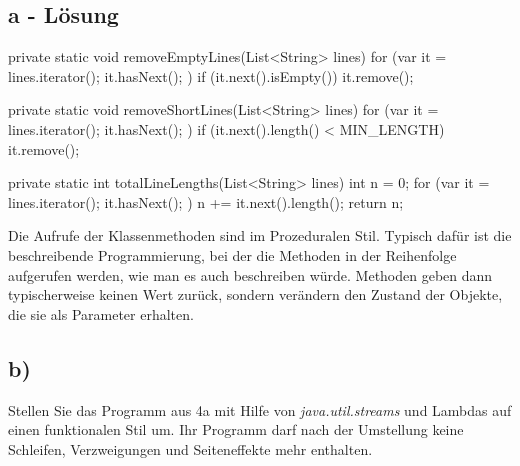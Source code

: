 \subsection*{a - Lösung}
\newline
\begin{code}[language=java, caption={Prozedurale Methoden}, label={lst:Aufgabe4a}]
    private static void removeEmptyLines(List<String> lines) {
        for (var it = lines.iterator(); it.hasNext(); ) {
            if (it.next().isEmpty()) {
                it.remove();
            }
        }
    }

    private static void removeShortLines(List<String> lines) {
        for (var it = lines.iterator(); it.hasNext(); ) {
            if (it.next().length() < MIN_LENGTH) {
                it.remove();
            }
        }
    }

    private static int totalLineLengths(List<String> lines) {
        int n = 0;
        for (var it = lines.iterator(); it.hasNext(); ) {
            n += it.next().length();
        }
        return n;
    }
\end{code}
\newline
Die Aufrufe der Klassenmethoden sind im Prozeduralen Stil.
Typisch dafür ist die beschreibende Programmierung, bei der die Methoden in der Reihenfolge aufgerufen werden, wie man es auch beschreiben würde.
Methoden geben dann typischerweise keinen Wert zurück, sondern verändern den Zustand der Objekte, die sie als Parameter erhalten.
\newline

\subsection*{b)}
Stellen Sie das Programm aus 4a mit Hilfe von \textit{java.util.streams} und Lambdas auf einen funktionalen Stil um.
Ihr Programm darf nach der Umstellung keine Schleifen, Verzweigungen und Seiteneffekte mehr enthalten.
\newline
\newline

